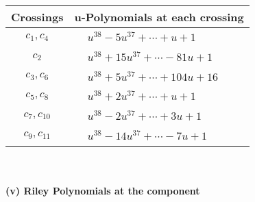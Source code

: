 \documentclass[1p]{elsarticle_modified}
\theoremstyle{definition}
\begin{document}
\begin{tabular}{m{50pt}|m{274pt}}
Crossings & \hspace{64pt}u-Polynomials at each crossing \\
\hline $$\begin{aligned}c_{1},c_{4}\end{aligned}$$&$\begin{aligned}
&u^{38}-5 u^{37}+\cdots+u+1
\end{aligned}$\\
\hline $$\begin{aligned}c_{2}\end{aligned}$$&$\begin{aligned}
&u^{38}+15 u^{37}+\cdots-81 u+1
\end{aligned}$\\
\hline $$\begin{aligned}c_{3},c_{6}\end{aligned}$$&$\begin{aligned}
&u^{38}+5 u^{37}+\cdots+104 u+16
\end{aligned}$\\
\hline $$\begin{aligned}c_{5},c_{8}\end{aligned}$$&$\begin{aligned}
&u^{38}+2 u^{37}+\cdots+u+1
\end{aligned}$\\
\hline $$\begin{aligned}c_{7},c_{10}\end{aligned}$$&$\begin{aligned}
&u^{38}-2 u^{37}+\cdots+3 u+1
\end{aligned}$\\
\hline $$\begin{aligned}c_{9},c_{11}\end{aligned}$$&$\begin{aligned}
&u^{38}-14 u^{37}+\cdots-7 u+1
\end{aligned}$\\
\hline
\end{tabular}\\~\\
\newpage\renewcommand{\arraystretch}{1}
\flushleft \textbf{(v) Riley Polynomials at the component}\newline \\
\end{document}
